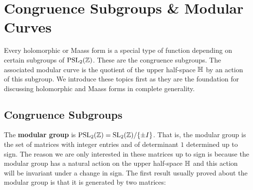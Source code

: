 \chapter{Congruence Subgroups \& Modular Curves}
  Every holomorphic or Maass form is a special type of function depending on certain subgroups of $\mathrm{PSL}_{2}(\mathbb{Z})$. These are the congruence subgroups. The associated modular curve is the quotient of the upper half-space $\mathbb{H}$ by an action of this subgroup. We introduce these topics first as they are the foundation for discussing holomorphic and Maass forms in complete generality.
  \section{Congruence Subgroups}
    The \textbf{modular group} is $\mathrm{PSL}_{2}(\mathbb{Z}) = \mathrm{SL}_{2}(\mathbb{Z})/\{\pm I\}$. That is, the modular group is the set of matrices with integer entries and of determinant $1$ determined up to sign. The reason we are only interested in these matrices up to sign is because the modular group has a natural action on the upper half-space $\mathbb{H}$ and this action will be invariant under a change in sign. The first result usually proved about the modular group is that it is generated by two matrices:

